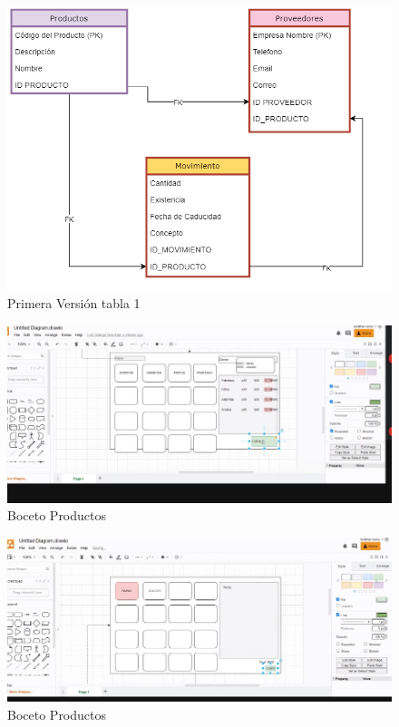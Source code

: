 \documentclass[a4paper,DIV=12]{scrreprt}
\begin{document}
		\begin{figure}[h!]
		\centering
		\includegraphics[scale=0.4]{Version 1 tabla.PNG}
		\caption{Primera Versión tabla 1}
		\end{figure}
		
		\begin{figure}[h!]
		\centering
		\includegraphics[scale=0.4]{boceto 1.jpg}
		\caption{Boceto Productos}
		\end{figure}
		
		
		\begin{figure}[h!]
		\centering
		\includegraphics[scale=0.4]{boceto 2.jpg}
		\caption{Boceto Productos}
		\end{figure}
		
\end{document}
